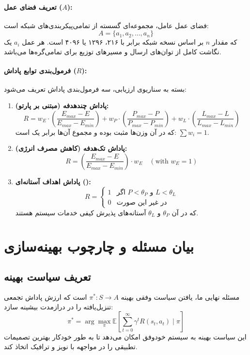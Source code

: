 \documentclass[oneside,openany,phd]{TMU-Thesis}
\begin{document}
\paragraph{تعریف فضای عمل ($A$):}
فضای عمل عامل، مجموعه‌ای گسسته از تمامی‌پیکربندی‌های شبکه است:
$$A = \{a_1, a_2, \ldots, a_n\}$$
که مقدار $n$ بر اساس نسخه شبکه برابر با ۲۱۶، ۱۲۹۶ یا ۴۰۹۶ است. هر عمل $a_i$ یک نگاشت کامل از توان‌های ارسال و مسیرهای توزیع برای تمامی‌گره‌ها می‌باشد.

\paragraph{فرمول‌بندی توابع پاداش ($R$):}
بسته به سناریوی ارزیابی، سه فرمول‌بندی پاداش تعریف می‌شود:
\begin{enumerate}
    \item \textbf{پاداش چندهدفه (مبتنی بر پارتو):}
    $$R = w_E \cdot \left(\frac{E_{max} - E}{E_{max} - E_{min}}\right) + w_P \cdot \left(\frac{P_{max} - P}{P_{max} - P_{min}}\right) + w_L \cdot \left(\frac{L_{max} - L}{L_{max} - L_{min}}\right)$$
    که در آن وزن‌ها مثبت بوده و مجموع آن‌ها برابر یک است: $\sum w_i = 1$.
    \item \textbf{پاداش تک‌هدفه (کاهش مصرف انرژی):}
    $$R = \left(\frac{E_{max} - E}{E_{max} - E_{min}}\right) \cdot w_E \quad (\text{with } w_E = 1)$$
    \item \textbf{پاداش اهداف آستانه‌ای ():}
    $$R = \begin{cases} 
    1 & \text{اگر } P < \theta_P \text{ و } L < \theta_L \\
    0 & \text{در غیر این صورت}
    \end{cases}$$
    که در آن $\theta_P$ و $\theta_L$ آستانه‌های پذیرش کیفی خدمات سیستم هستند.
\end{enumerate}

\section{بیان مسئله و چارچوب بهینه‌سازی}

\subsection{تعریف سیاست بهینه}

مسئله نهایی ما، یافتن سیاست وفقی بهینه $\pi^*: S \rightarrow A$ است که ارزش پاداش تجمعی تنزیل‌یافته را در درازمدت بیشینه سازد:
$$\pi^* = \arg\max_{\pi} \mathbb{E}\left[\sum_{t=0}^{\infty} \gamma^t R(s_t, a_t) \mid \pi\right]$$
این سیاست بهینه به سیستم خودوفق امکان می‌دهد تا به طور خودکار بهترین تصمیمات تطبیقی را در مواجهه با نویز و ترافیک اتخاذ کند.
\end{document}
